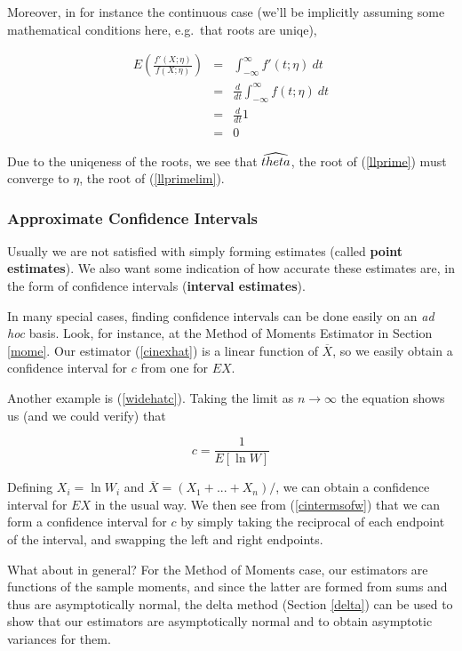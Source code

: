 Moreover, in for instance the continuous case (we'll be implicitly
assuming some mathematical conditions here, e.g.\ that roots are uniqe),

\begin{eqnarray}
E \left (
\frac{f'(X;\eta)}
     {f(X;\eta)}
     \right ) &=&
\int_{-\infty}^{\infty} f'(t;\eta) ~ dt \\
&=& \frac{d}{dt}\int_{-\infty}^{\infty} f(t;\eta) ~ dt \\
&=& \frac{d}{dt} 1 \\
&=& 0
\end{eqnarray}

Due to the uniqeness of the roots, we see that $\widehat{\\theta}$, 
the root of (\ref{llprime}) must converge to $\eta$, the root of
(\ref{llprimelim}).

\subsubsection{Approximate Confidence Intervals}

Usually we are not satisfied with simply forming estimates (called {\bf
point estimates}).  We also want some indication of how accurate these
estimates are, in the form of confidence intervals ({\bf interval
estimates}).

In many special cases, finding confidence intervals can be done easily
on an {\it ad hoc} basis.  Look, for instance, at the Method of Moments
Estimator in Section \ref{mome}.  Our estimator (\ref{cinexhat}) is a
linear function of $\overline{X}$, so we easily obtain a confidence
interval for $c$ from one for $EX$.

Another example is (\ref{widehatc}).  Taking the limit as $n \rightarrow
\infty$ the equation shows us (and we could verify) that 

\begin{equation}
\label{cintermsofw}
c = \frac{1}{E[\ln{W}]}
\end{equation}

Defining $X_i = \ln{W_i}$ and $\overline{X} = (X_1+...+X_n)/$, we can
obtain a confidence interval for $EX$ in the usual way.  We then see
from (\ref{cintermsofw}) that we can form a confidence interval for $c$
by simply taking the reciprocal of each endpoint of the interval, and
swapping the left and right endpoints.

What about in general?  For the Method of Moments case, our estimators
are functions of the sample moments, and since the latter are formed
from sums and thus are asymptotically normal, the delta method (Section
\ref{delta}) can be used to show that our estimators are asymptotically
normal and to obtain asymptotic variances for them.

